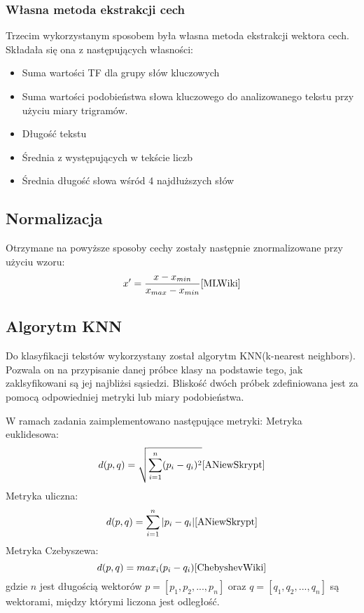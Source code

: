 \documentclass{classrep}
\begin{document}
\subsubsection{Własna metoda ekstrakcji cech}
Trzecim wykorzystanym sposobem była własna metoda ekstrakcji wektora cech. Składała się ona z następujących własności:
\begin{itemize}
	\item Suma wartości TF dla grupy słów kluczowych
	\item Suma wartości podobieństwa słowa kluczowego do analizowanego tekstu przy użyciu miary trigramów. \cite{ANiewSkrypt}
	\item Długość tekstu
	\item Średnia z występujących w tekście liczb
	\item Średnia długość słowa wśród 4 najdłuższych słów
\end{itemize}


\subsection{Normalizacja}
Otrzymane na powyższe sposoby cechy zostały następnie znormalizowane przy użyciu wzoru:
\begin{equation}
x' = \frac{x-x_{min}}{x_{max}-x_{min}} \cite{MLWiki}
\end{equation}

\subsection{Algorytm KNN}
Do klasyfikacji tekstów wykorzystany został algorytm KNN(k-nearest neighbors). Pozwala on na przypisanie danej próbce klasy na podstawie tego, jak zaklsyfikowani są jej najbliżsi sąsiedzi. Bliskość dwóch próbek zdefiniowana jest za pomocą odpowiedniej metryki lub miary podobieństwa. \cite{KNNWiki}

W ramach zadania zaimplementowano następujące metryki: \newline
Metryka euklidesowa:
\begin{equation}
d(p,q) = \sqrt{\sum_{i=1}^{n} (p_{i} -q_{i})^{2}} \cite{ANiewSkrypt}
\end{equation}
Metryka uliczna:
\begin{equation}
d(p,q) = \sum_{i=1}^{n} |p_{i} -q_{i}| \cite{ANiewSkrypt}
\end{equation}
Metryka Czebyszewa:
\begin{equation}
d(p,q) = max_{i}(p_{i} -q_{i}) \cite{ChebyshevWiki}
\end{equation}
gdzie \(n\) jest długością wektorów \(p = [p_{1}, p_{2}, ..., p_{n}]\) oraz \(q = [q_{1}, q_{2}, ..., q_{n}]\) są wektorami, między którymi liczona jest odległość. 
\end{document}
